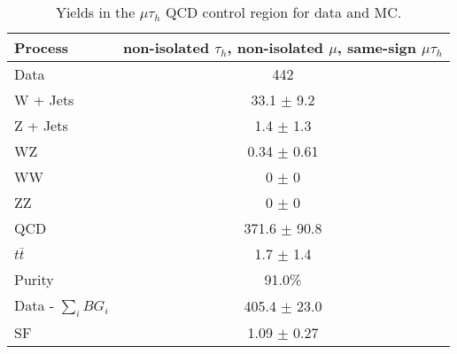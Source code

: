 \begin{table}[htbp!]
\begin{center}
 \caption{ Yields in the $\mu\tau_{h}$ QCD control region for data and MC.}
 \begin{tabular}{| l | c |}
 \hline\hline
Process & non-isolated $\tau_{h}$, non-isolated $\mu$, same-sign $\mu\tau_{h}$ \\ \hline
Data & 442 \\
W + Jets & 33.1 $\pm$ 9.2 \\
Z + Jets & 1.4 $\pm$ 1.3 \\
WZ & 0.34 $\pm$ 0.61 \\
WW & 0 $\pm$ 0 \\
ZZ & 0 $\pm$ 0 \\
QCD & 371.6 $\pm$ 90.8 \\
$t\bar{t}$ & 1.7 $\pm$ 1.4 \\ \hline
Purity & 91.0\% \\
Data - $\sum\limits_{i} BG_{i}$ & 405.4 $\pm$ 23.0 \\ \hline
SF & 1.09 $\pm$ 0.27 \\
 \hline
 \hline
 \end{tabular}
 \label{table:theQCDMuTauControlTable}
\end{center}
\end{table}

